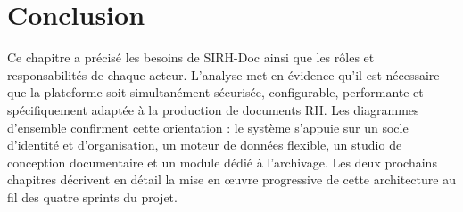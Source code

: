 \section{Conclusion}

Ce chapitre a précisé les besoins de SIRH-Doc ainsi que les rôles et responsabilités de chaque acteur. L’analyse met en évidence qu’il est nécessaire que la plateforme soit simultanément sécurisée, configurable, performante et spécifiquement adaptée à la production de documents RH. Les diagrammes d’ensemble confirment cette orientation : le système s’appuie sur un socle d’identité et d’organisation, un moteur de données flexible, un studio de conception documentaire et un module dédié à l’archivage. Les deux prochains chapitres décrivent en détail la mise en œuvre progressive de cette architecture au fil des quatre sprints du projet.
